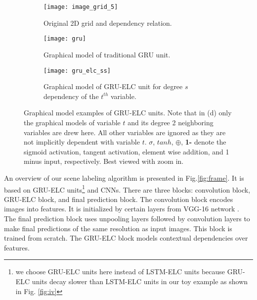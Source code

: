 \documentclass[10pt,twocolumn,letterpaper]{article}
\begin{document}
\begin{figure}[t]
\centering

   \begin{subfigure}{0.45\linewidth}
   \centering
   \texttt{[image: image\_grid\_5]}
   \caption{Original 2D grid and dependency relation.}
   \label{fig:image_grid_5} 
\end{subfigure}
\hfill
\begin{subfigure}{0.45\linewidth}
   \centering
   \texttt{[image: gru]}
   \caption{Graphical model of traditional GRU unit.}
   \label{fig:gru}
\end{subfigure}
\begin{subfigure}{1\linewidth}
   \centering
   \texttt{[image: gru\_elc\_ss]}
   \caption{Graphical model of GRU-ELC unit for degree $s$ dependency of the $t^{th}$ variable.}
   \label{fig:gru_elc_s2}
\end{subfigure}

\centering
\caption{Graphical model examples of GRU-ELC units. Note that in (d) only the graphical models of variable $t$ and its degree 2 neighboring variables are drew here. All other variables are ignored as they are not implicitly dependent with variable $t$.  $\sigma$, $tanh$, $\oplus$, \textbf{1-} denote the sigmoid activation, tangent activation, element wise addition, and 1 minus input, respectively. Best viewed with zoom in.}
\end{figure}






An overview of our scene labeling algorithm is presented in Fig.\ref{fig:frame}. It is based on GRU-ELC units\footnote{we choose GRU-ELC units here instead of LSTM-ELC units because GRU-ELC units decay slower than LSTM-ELC units in our toy example as shown in Fig. \ref{fig:iv}} and CNNs. There are three blocks: convolution block, GRU-ELC block, and final prediction block. The convolution block encodes images into features. It is initialized by certain layers from VGG-16 network \cite{vgg}. The final prediction block uses unpooling layers followed by convolution layers to make final predictions of the same resolution as input images. This block is trained from scratch. The GRU-ELC block models contextual dependencies over features.
\end{document}
